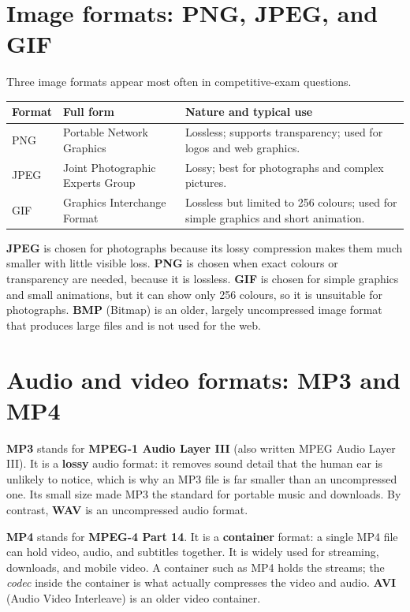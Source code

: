 \documentclass[11pt]{article}
\begin{document}
\section{Image formats: PNG, JPEG, and GIF}
Three image formats appear most often in competitive-exam questions.

\begin{center}
\begin{tabular}{p{}p{}p{}}
\toprule
\textbf{Format} & \textbf{Full form} & \textbf{Nature and typical use} \\
\midrule
PNG & Portable Network Graphics & Lossless; supports transparency; used for logos and web graphics. \\
JPEG & Joint Photographic Experts Group & Lossy; best for photographs and complex pictures. \\
GIF & Graphics Interchange Format & Lossless but limited to 256 colours; used for simple graphics and short animation. \\
\bottomrule
\end{tabular}
\end{center}

\textbf{JPEG} is chosen for photographs because its lossy compression makes
them much smaller with little visible loss. \textbf{PNG} is chosen when exact
colours or transparency are needed, because it is lossless. \textbf{GIF} is
chosen for simple graphics and small animations, but it can show only 256
colours, so it is unsuitable for photographs. \textbf{BMP} (Bitmap) is an
older, largely uncompressed image format that produces large files and is not
used for the web.

\section{Audio and video formats: MP3 and MP4}
\textbf{MP3} stands for \textbf{MPEG-1 Audio Layer III} (also written MPEG
Audio Layer III). It is a \textbf{lossy} audio format: it removes sound detail
that the human ear is unlikely to notice, which is why an MP3 file is far
smaller than an uncompressed one. Its small size made MP3 the standard for
portable music and downloads. By contrast, \textbf{WAV} is an uncompressed
audio format.

\textbf{MP4} stands for \textbf{MPEG-4 Part 14}. It is a \textbf{container}
format: a single MP4 file can hold video, audio, and subtitles together. It is
widely used for streaming, downloads, and mobile video. A container such as
MP4 holds the streams; the \emph{codec} inside the container is what actually
compresses the video and audio. \textbf{AVI} (Audio Video Interleave) is an
older video container.
\end{document}
